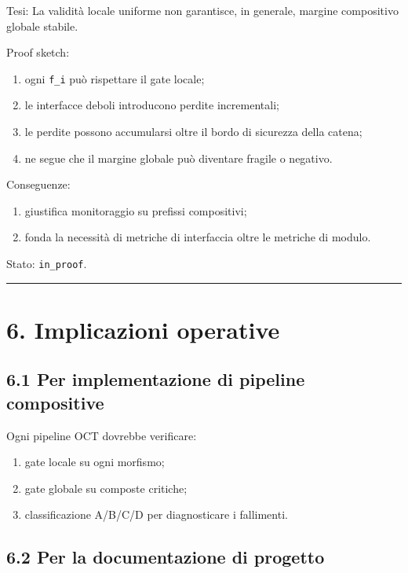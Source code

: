 Tesi:
La validità locale uniforme non garantisce, in generale, margine compositivo globale stabile.

Proof sketch:

\begin{enumerate}
\def\labelenumi{\arabic{enumi}.}
\tightlist
\item
  ogni \texttt{f\_i} può rispettare il gate locale;
\item
  le interfacce deboli introducono perdite incrementali;
\item
  le perdite possono accumularsi oltre il bordo di sicurezza della catena;
\item
  ne segue che il margine globale può diventare fragile o negativo.
\end{enumerate}

Conseguenze:

\begin{enumerate}
\def\labelenumi{\arabic{enumi}.}
\tightlist
\item
  giustifica monitoraggio su prefissi compositivi;
\item
  fonda la necessità di metriche di interfaccia oltre le metriche di modulo.
\end{enumerate}

Stato: \texttt{in\_proof}.

\begin{center}\rule{0.5\linewidth}{0.5pt}\end{center}

\section{6. Implicazioni operative}

\subsection{6.1 Per implementazione di pipeline compositive}

Ogni pipeline OCT dovrebbe verificare:

\begin{enumerate}
\def\labelenumi{\arabic{enumi}.}
\tightlist
\item
  gate locale su ogni morfismo;
\item
  gate globale su composte critiche;
\item
  classificazione A/B/C/D per diagnosticare i fallimenti.
\end{enumerate}

\subsection{6.2 Per la documentazione di progetto}

